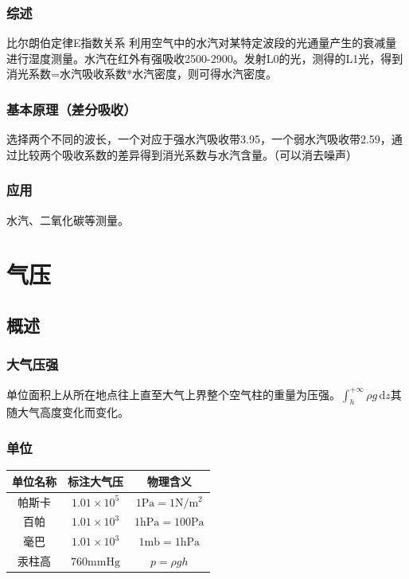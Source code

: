 \documentclass[UTF8,11pt]{ctexbook}
\begin{document}
\subsection{综述}

比尔朗伯定律E指数关系 利用空气中的水汽对某特定波段的光通量产生的衰减量进行湿度测量。水汽在红外有强吸收2500-2900。发射L0的光，测得的L1光，得到消光系数=水汽吸收系数*水汽密度，则可得水汽密度。

\subsection{基本原理（差分吸收）}

选择两个不同的波长，一个对应于强水汽吸收带3.95，一个弱水汽吸收带2.59，通过比较两个吸收系数的差异得到消光系数与水汽含量。（可以消去噪声）

\subsection{应用}

水汽、二氧化碳等测量。

\chapter{气压}

\section{概述}

\subsection{大气压强}

单位面积上从所在地点往上直至大气上界整个空气柱的重量为压强。\(\int_h^{+\infty}\rho g\,\mathrm{d}z\)其随大气高度变化而变化。

\subsection{单位}

\begin{table}[htbp]
    \centering
    \begin{tabular}{ccc}
        \toprule
        单位名称 & 标注大气压 & 物理含义\\
        \midrule
        帕斯卡 & \(1.01\times10^5\) & \(1\mathrm{Pa}=1\mathrm{N/m^2}\)\\
        百帕 & \(1.01\times10^3\) & \(1\mathrm{hPa}=100\mathrm{Pa}\)\\
        毫巴 & \(1.01\times10^3\) & \(1\mathrm{mb}=1\mathrm{hPa}\)\\
        汞柱高 & \(760\mathrm{mmHg}\) & \(p=\rho gh\)\\
        \bottomrule
    \end{tabular}
\end{table}
\end{document}
